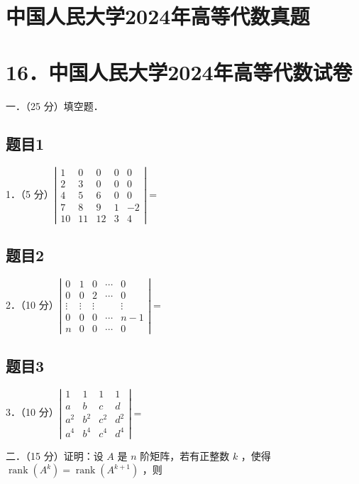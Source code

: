 \documentclass{article}
\begin{document}
\section*{中国人民大学2024年高等代数真题}
\section*{16．中国人民大学2024年高等代数试卷}
一．（25 分）填空题．\\

\subsection{题目1}
1．（5 分）\(\left|\begin{array}{ccccc}1 & 0 & 0 & 0 & 0 \\ 2 & 3 & 0 & 0 & 0 \\ 4 & 5 & 6 & 0 & 0 \\ 7 & 8 & 9 & 1 & -2 \\ 10 & 11 & 12 & 3 & 4\end{array}\right|=\)\\

\subsection{题目2}
2．（10 分）\(\left|\begin{array}{ccccc}0 & 1 & 0 & \cdots & 0 \\ 0 & 0 & 2 & \cdots & 0 \\ \vdots & \vdots & \vdots & & \vdots \\ 0 & 0 & 0 & \cdots & n-1 \\ n & 0 & 0 & \cdots & 0\end{array}\right|=\)\\

\subsection{题目3}
3．（10 分）\(\left|\begin{array}{cccc}1 & 1 & 1 & 1 \\ a & b & c & d \\ a^{2} & b^{2} & c^{2} & d^{2} \\ a^{4} & b^{4} & c^{4} & d^{4}\end{array}\right|=\)

二．（15 分）证明：设 \(A\) 是 \(n\) 阶矩阵，若有正整数 \(k\) ，使得 \(\operatorname{rank}\left(A^{k}\right)=\operatorname{rank}\left(A^{k+1}\right)\) ，则
\end{document}
